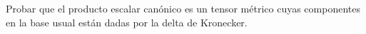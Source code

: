 \item Probar que el producto escalar canónico es un tensor métrico cuyas componentes en la base usual están dadas por la delta de Kronecker.
    \begin{mdframed}[style=s]
        
    \end{mdframed}